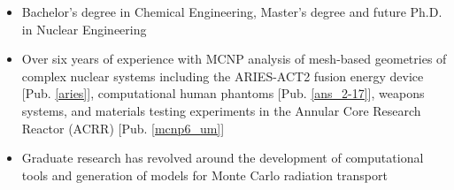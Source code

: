 \documentclass[a4paper,10pt]{article}
\begin{document}
\begin{itemize}[leftmargin=.9in,rightmargin=.875in,itemsep=1.6mm]

               \item Bachelor's degree in Chemical Engineering, Master's degree
		       and future Ph.D. in Nuclear Engineering
                \item Over six years of experience with MCNP analysis of
			mesh-based geometries of complex nuclear
		      systems including the ARIES-ACT2 fusion energy device
		      [Pub. \ref{aries}],
		      computational human phantoms
		      [Pub. \ref{ans_2-17}], weapons systems, and materials testing
		      experiments in the
		      Annular Core Research Reactor (ACRR) [Pub.
		      \ref{mcnp6_um}]
	       \item Graduate research has revolved around the development of
		       computational tools 
		       and generation of models for Monte Carlo radiation transport

\end{itemize}
\end{document}
